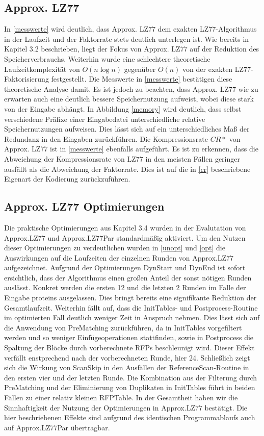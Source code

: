 \subsection{Approx. LZ77}
In \ref{messwerte} wird deutlich, dass Approx. LZ77 dem exakten LZ77-Algorithmus in der Laufzeit und der Faktorrate stets deutlich unterlegen ist. Wie bereits in Kapitel
3.2 beschrieben, liegt der Fokus von Approx. LZ77 auf der Reduktion des Speicherverbrauchs. Weiterhin wurde eine schlechtere theoretische Laufzeitkomplexität von
$O(n\log n)$ gegenüber $O(n)$ von der exakten LZ77-Faktorisierung festgestellt. Die Messwerte in \ref{messwerte} bestätigen diese theoretische Analyse damit. Es ist 
jedoch zu beachten, dass Approx. LZ77 wie zu erwarten auch eine deutlich bessere Speichernutzung aufweist, wobei diese stark von der Eingabe abhängt. In Abbildung 
\ref{memory} wird deutlich, dass selbst verschiedene Präfixe einer Eingabedatei unterschiedliche relative Speichernutzungen aufweisen. Dies lässt sich auf ein 
unterschiedliches Maß der Redundanz in den Eingaben zurückführen. Die Kompressionsrate $CR*$ von Approx. LZ77 ist in \ref{messwerte} ebenfalls aufgeführt. Es ist 
zu erkennen, dass die Abweichung der Kompressionsrate von LZ77 in den meisten Fällen geringer ausfällt als die Abweichung der Faktorrate. Dies ist auf die in 
\ref{cr} beschriebene Eigenart der Kodierung zurückzuführen.

\subsection{Approx. LZ77 Optimierungen}
Die praktische Optimierungen aus Kapitel 3.4 wurden in der Evalutation von Approx.LZ77 und Approx.LZ77Par standardmäßig aktiviert. Um den Nutzen dieser Optimierungen
zu verdeutlichen wurden in \ref{unopt} und \ref{opt} die Auswirkungen auf die Laufzeiten der einzelnen Runden von Approx.LZ77 aufgezeichnet. Aufgrund der 
Optimierungen DynStart und DynEnd ist sofort ersichtlich, dass der Algorithmus einen großen Anteil der sonst nötigen Runden auslässt. Konkret werden die ersten 12 und
die letzten 2 Runden im Falle der Eingabe proteins ausgelassen. Dies bringt bereits eine signifikante Reduktion der Gesamtlaufzeit. Weiterhin fällt auf, dass die 
InitTables- und Postprocess-Routine im optimierten Fall deutlich weniger Zeit in Anspruch nehmen. Dies lässt sich auf die Anwendung von PreMatching zurückführen,
da in InitTables vorgefiltert werden und so weniger Einfügeoperationen stattfinden, sowie in Postprocess die Spaltung der Blöcke durch vorberechnete RFPs
beschleunigt wird. Dieser Effekt verfällt enstprechend nach der vorberechneten Runde, hier 24. Schließlich zeigt sich die Wirkung von ScanSkip in den Ausfällen
der ReferenceScan-Routine in den ersten vier und der letzten Runde. Die Kombination aus der Filterung durch PreMatching und der Eliminierung von Duplikaten in 
InitTables führt in beiden Fällen zu einer relativ kleinen RFPTable. In der Gesamtheit haben wir die Sinnhaftigkeit der Nutzung der Optimierungen in Approx.LZ77 
bestätigt. Die hier beschriebenen Effekte sind aufgrund des identischen Programmablaufs auch auf Approx.LZ77Par übertragbar.


